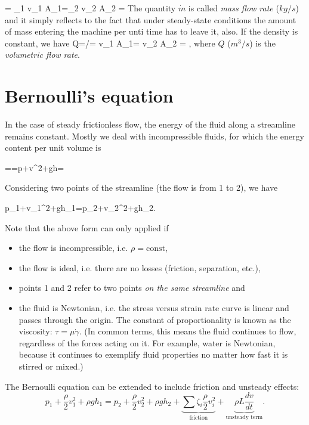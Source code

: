 \beq
{} = \rho_1 v_1 A_1=\rho_2 v_2 A_2 = 
\eeq
%
The quantity $\dot{m}$ is called \emph{mass flow rate} ($kg/s$) and it simply reflects to the fact that under steady-state conditions the amount of mass entering the machine per unti time has to leave it, also. If the density is constant, we have
%
\beq
Q=/\rho = v_1 A_1= v_2 A_2 = ,
\eeq
%
where $Q$ ($m^3/s$) is the \emph{volumetric flow rate}.
\section{Bernoulli's equation}

In the case of steady frictionless flow, the energy of the fluid along a streamline remains constant. Mostly we deal with incompressible fluids, for which the energy content per unit volume is

\beq
{}==p+v^2+\rho gh=
\eeq

Considering two points of the streamline (the flow is from 1 to 2), we have

\beq
p_1+v_1^2+\rho gh_1=p_2+v_2^2+\rho gh_2.
\eeq

Note that the above form can only applied if
\begin{itemize}
\item the flow is incompressible, i.e. $\rho=\text{const}$,
\item the flow is ideal, i.e. there are no losses (friction, separation, etc.),
\item points 1 and 2 refer to two points \emph{on the same streamline} and
\item the fluid is Newtonian, i.e. the stress versus strain rate curve is linear and passes through the origin. The constant of proportionality is known as the viscosity: $\tau=\mu \dot{\gamma}$. (In common terms, this means the fluid continues to flow, regardless of the forces acting on it. For example, water is Newtonian, because it continues to exemplify fluid properties no matter how fast it is stirred or mixed.)
\end{itemize}

The Bernoulli equation can be extended to include friction and unsteady effects:
%
\begin{equation}
p_1+\frac{\rho}{2}v_1^2+\rho gh_1=p_2+\frac{\rho}{2}v_2^2+\rho gh_2 + \underbrace{\sum \zeta_i \frac{\rho}{2}v_i^2}_{\text{friction}} + \underbrace{\rho L \frac{dv}{dt}}_{\text{unsteady term}}.
\end{equation}

